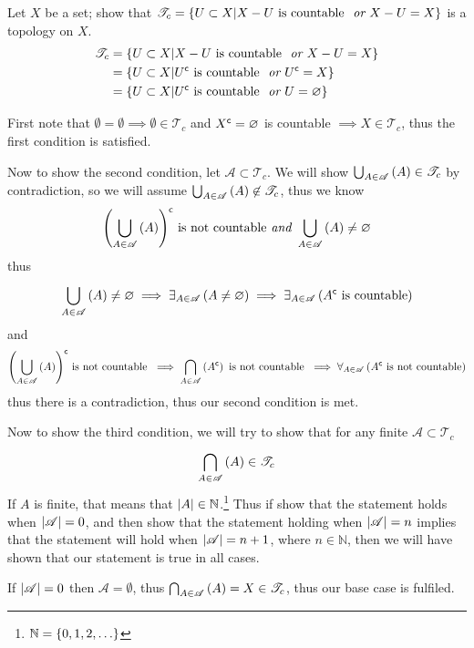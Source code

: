 \documentclass{article}
\begin{document}
 Let $X$ be a set; show that $\mathscr T_c = \left\{ {U\subset X | X-U \text{ is countable } \textit{ or } X - U = X} \right\}$ is a topology on $X$.
\begin{align*}
\mathscr T_c &= \left\{ {U\subset X | X-U \text{ is countable } \textit{ or } X - U = X} \right\} \\
&= \left\{ {U\subset X | {U}^{\mathsf{c}} \text{ is countable } \textit{ or } {U}^{\mathsf{c}} = X} \right\} \\
&= \left\{ {U\subset X | {U}^{\mathsf{c}} \text{ is countable } \textit{ or } U = \varnothing} \right\}
\end{align*}

First note that $\emptyset = \emptyset \implies \emptyset \in \mathscr T_c$ and ${X}^{\mathsf{c}} = \varnothing$ is countable $\implies X \in \mathscr T_c$, thus the first condition is satisfied.

Now to show the second condition, let $\mathscr A \subset \mathscr T_c$. We will show $\bigcup_{A\in\mathscr A}^{} \left( {A} \right) \in \mathscr T_c$ by contradiction, so we will assume $\bigcup_{A\in\mathscr A}^{} \left( {A} \right) \not\in \mathscr T_c$, thus we know \[{\left(\bigcup_{A\in\mathscr A}^{} \left( {A} \right)\right)}^{\mathsf{c}}\text{ is not countable}\textit{ and }\bigcup_{A\in\mathscr A}^{} \left( {A} \right) \not= \varnothing\] thus \[\bigcup_{A\in\mathscr A}^{} \left( {A} \right)\not=\varnothing\implies\exists_{A\in\mathscr A}\left( {A\not=\varnothing} \right)\implies\exists_{A\in\mathscr A}\left( {{A}^{\mathsf{c}}\text{ is countable}} \right)\] and \[{\left(\bigcup_{A\in\mathscr A}^{} \left( {A} \right)\right)}^{\mathsf{c}}\text{ is not countable }\implies\bigcap_{A\in\mathscr A}^{} \left( {{A}^{\mathsf{c}}} \right)\text{ is not countable }\implies\forall_{A\in\mathscr A}\left( {A}^{\mathsf{c}}\text{ is not countable} \right)\] thus there is a contradiction, thus our second condition is met.

Now to show the third condition, we will try to show that for any finite $\mathscr A \subset \mathscr T_c$\[\bigcap_{A\in\mathscr A}^{} \left( {A} \right)\in\mathscr T_c\] If $A$ is finite, that means that $\left| A \right| \in \mathbb N$.\footnote{$\mathbb N = \left\{ {0, 1, 2, \ldots} \right\}$} Thus if show that the statement holds when $\left| \mathscr A \right| = 0$, and then show that the statement holding when $\left| \mathscr A \right|=n$ implies that the statement will hold when $\left| \mathscr A \right|=n+1$, where $n \in \mathbb N$, then we will have shown that our statement is true in all cases.

If $\left| \mathscr A \right| = 0$ then $\mathscr A = \emptyset$, thus $\bigcap_{A\in\mathscr A}^{} \left( {A} \right) = X \in \mathscr T_c$, thus our base case is fulfiled.
\end{document}
